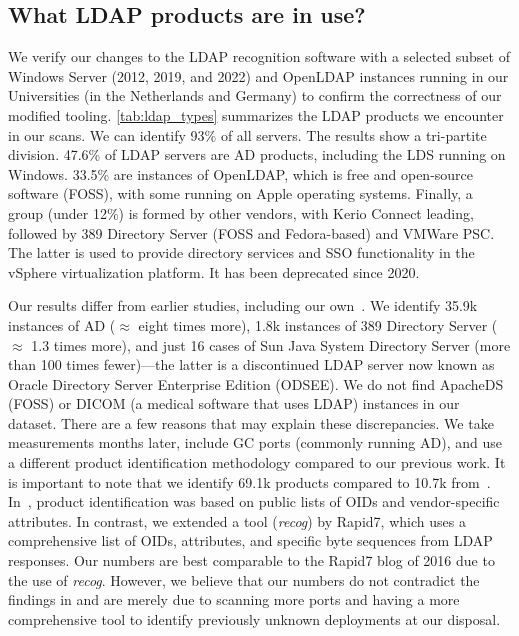 \subsection{What LDAP products are in use?}


We verify our changes to the \gls{LDAP} recognition software with a selected subset of Windows Server (2012, 2019, and 2022) and OpenLDAP instances running in our Universities (in the Netherlands and Germany) to confirm the correctness of our modified tooling.
\cref{tab:ldap_types} summarizes the \gls{LDAP} products we encounter in our scans. We can identify 93\% of all servers. The results show a tri-partite division. 47.6\% of \gls{LDAP} servers are \gls{AD} products, including the \gls{LDS} running on Windows. 33.5\% are instances of OpenLDAP, which is free and open-source software (FOSS), with some running on Apple operating systems. Finally, a group (under 12\%) is formed by other vendors, with Kerio Connect leading, followed by 389 Directory Server (FOSS and Fedora-based) and VMWare PSC. The latter is used to provide directory services and SSO functionality in the vSphere virtualization platform. It has been deprecated since 2020.

Our results differ from earlier studies, including our own~\cite{landscape}. We identify 35.9k instances of \gls{AD} ($\approx$ eight times more), 1.8k instances of 389 Directory Server ($\approx$ 1.3 times more), and just 16 cases of Sun Java System Directory Server (more than 100 times fewer)---the latter is a discontinued \gls{LDAP} server now known as Oracle Directory Server Enterprise Edition (ODSEE).
We do not find ApacheDS (FOSS) or DICOM (a medical software that uses \gls{LDAP}) instances in our dataset. There are a few reasons that may explain these discrepancies. We take measurements months later, include \gls{GC} ports (commonly running \gls{AD}), and use a different product identification methodology compared to our previous work. It is important to note that we identify 69.1k products compared to 10.7k from~\cite{landscape}. In~\cite{landscape}, product identification was based on public lists of OIDs and vendor-specific attributes. In contrast, we extended a tool (\textit{recog}) by Rapid7, which uses a comprehensive list of OIDs, attributes, and specific byte sequences from \gls{LDAP} responses. Our numbers are best comparable to the Rapid7 blog of 2016 due to the use of \textit{recog}. However, we believe that our numbers do not contradict the findings in \cite{landscape} and are merely due to scanning more ports and having a more comprehensive tool to identify previously unknown deployments at our disposal.

